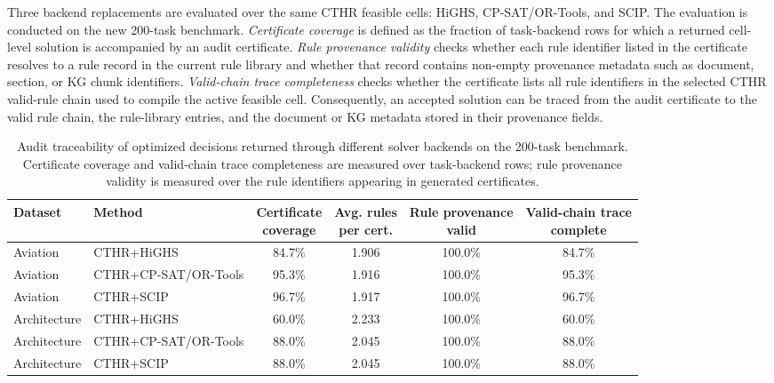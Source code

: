 ﻿\documentclass[a4paper,fleqn]{cas-dc}
\newcommand{\CTHR}{\textsc{CTHR}}
\begin{document}
Three backend replacements are evaluated over the same \CTHR{}
feasible cells: HiGHS, CP-SAT/OR-Tools, and SCIP. The evaluation is conducted
on the new 200-task benchmark. \emph{Certificate coverage} is defined as the
fraction of task-backend rows for which a returned cell-level solution is
accompanied by an audit certificate. \emph{Rule provenance validity} checks
whether each rule identifier listed in the certificate resolves to a rule
record in the current rule library and whether that record contains non-empty
provenance metadata such as document, section, or KG chunk identifiers.
\emph{Valid-chain trace completeness} checks whether the certificate lists all
rule identifiers in the selected \CTHR{} valid-rule chain used to compile the
active feasible cell. Consequently, an accepted solution can be traced from the
audit certificate to the valid rule chain, the rule-library entries, and the
document or KG metadata stored in their provenance fields.

\begin{table}[t]
\centering
\caption{Audit traceability of optimized decisions returned through different solver backends on the 200-task benchmark. Certificate coverage and valid-chain trace completeness are measured over task-backend rows; rule provenance validity is measured over the rule identifiers appearing in generated certificates.}
\label{tab:audit_traceability}
\footnotesize
\begin{tabular*}{\textwidth}{@{}l@{\extracolsep{\fill}}lcccc@{}}
\toprule
Dataset & Method & \shortstack{Certificate\\coverage} & \shortstack{Avg. rules\\per cert.} & \shortstack{Rule provenance\\valid} & \shortstack{Valid-chain trace\\complete} \\
\midrule
Aviation & \CTHR{}+HiGHS & 84.7\% & 1.906 & 100.0\% & 84.7\% \\
Aviation & \CTHR{}+CP-SAT/OR-Tools & 95.3\% & 1.916 & 100.0\% & 95.3\% \\
Aviation & \CTHR{}+SCIP & 96.7\% & 1.917 & 100.0\% & 96.7\% \\
Architecture & \CTHR{}+HiGHS & 60.0\% & 2.233 & 100.0\% & 60.0\% \\
Architecture & \CTHR{}+CP-SAT/OR-Tools & 88.0\% & 2.045 & 100.0\% & 88.0\% \\
Architecture & \CTHR{}+SCIP & 88.0\% & 2.045 & 100.0\% & 88.0\% \\
\bottomrule
\end{tabular*}
\end{table}
\end{document}
